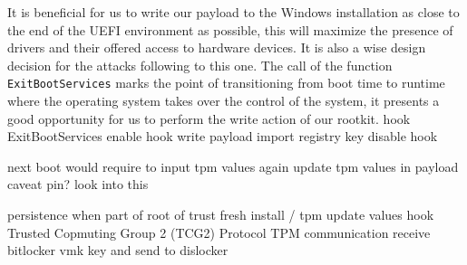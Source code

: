 It is beneficial for us to write our payload to the Windows installation as close to the end of the UEFI environment as possible, this will maximize the presence of drivers and their offered access to hardware devices. It is also a wise design decision for the attacks following to this one. The call of the function \lstinline{ExitBootServices} marks the point of transitioning from boot time to runtime where the operating system takes over the control of the system, it presents a good opportunity for us to perform the write action of our rootkit.
\cite{exitbootservices-hooking}
hook ExitBootServices
enable hook
write payload
import registry key
disable hook

next boot would require to input tpm values again
update tpm values in payload
caveat pin? look into this

persistence when part of root of trust
fresh install / tpm update values
hook Trusted Copmuting Group 2 (TCG2) Protocol
TPM communication
\cite[6.7.3]{tcg-efi-platform-spec}
receive bitlocker vmk key and send to dislocker

